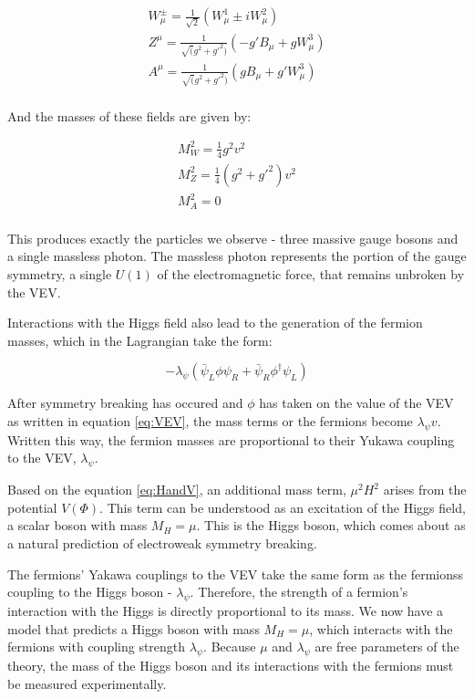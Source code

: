 \begin{equation}
\begin{gathered}
  \label{eq:EWKfields}
  W^\pm_\mu = \frac{1}{\sqrt{2}}(W^1_\mu \pm i W^2_\mu) \\
  Z^\mu = \frac{1}{\sqrt(g^2+g'^2)}(-g'B_\mu + gW^3_\mu) \\
  A^\mu = \frac{1}{\sqrt(g^2+g'^2)}(gB_\mu + g'W^3_\mu) \\
\end{gathered}
\end{equation}

And the masses of these fields are given by:

\begin{equation}
\begin{gathered}
  \label{eq:EWKmasses}
  M^2_W = \frac{1}{4}g^2v^2 \\
  M^2_Z = \frac{1}{4}(g^2+g'^2)v^2 \\
  M^2_A = 0 \\
\end{gathered}
\end{equation}

This produces exactly the particles we observe - three massive gauge bosons and a single massless photon. The massless photon represents the portion of the gauge symmetry, a single $U(1)$ of the electromagnetic force, that remains unbroken by the VEV.

Interactions with the Higgs field also lead to the generation of the fermion masses, which in the Lagrangian take the form:

\begin{equation}
  \label{eq:Lfermion}
  -\lambda_\psi (\bar{\psi}_L \phi \psi_R + \bar{\psi}_R \phi^\dagger \psi_L)
\end{equation}

After symmetry breaking has occured and $\phi$ has taken on the value of the VEV as written in equation \ref{eq:VEV}, the mass terms or the fermions become $\lambda_\psi v$. Written this way, the fermion masses are proportional to their Yukawa coupling to the VEV, $\lambda_\psi$. 

Based on the equation \ref{eq:HandV}, an additional mass term, $\mu^2H^2$ arises from the potential $V(\Phi)$. This term can be understood as an excitation of the Higgs field, a scalar boson with mass $M_H = \mu$. This is the Higgs boson, which comes about as a natural prediction of electroweak symmetry breaking. 

The fermions' Yakawa couplings to the VEV take the same form as the fermionss coupling to the Higgs boson - $\lambda_\psi$. Therefore, the strength of a fermion's interaction with the Higgs is directly proportional to its mass. We now have a model that predicts a Higgs boson with mass $M_H = \mu$, which interacts with the fermions with coupling strength $\lambda_\psi$. Because $\mu$ and $\lambda_\psi$ are free parameters of the theory, the mass of the Higgs boson and its interactions with the fermions must be measured experimentally. 

